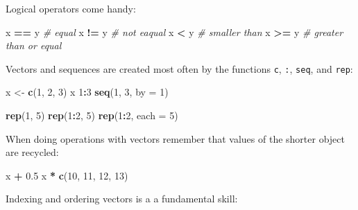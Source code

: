 \documentclass[12pt,]{book}
\newenvironment{Shaded}{\begin{snugshade}}{\end{snugshade}}
\newcommand{\CommentTok}[1]{\textcolor[rgb]{0.56,0.35,0.01}{\textit{#1}}}
\newcommand{\DataTypeTok}[1]{\textcolor[rgb]{0.13,0.29,0.53}{#1}}
\newcommand{\DecValTok}[1]{\textcolor[rgb]{0.00,0.00,0.81}{#1}}
\newcommand{\FloatTok}[1]{\textcolor[rgb]{0.00,0.00,0.81}{#1}}
\newcommand{\KeywordTok}[1]{\textcolor[rgb]{0.13,0.29,0.53}{\textbf{#1}}}
\newcommand{\NormalTok}[1]{#1}
\newcommand{\OperatorTok}[1]{\textcolor[rgb]{0.81,0.36,0.00}{\textbf{#1}}}
\newcommand{\StringTok}[1]{\textcolor[rgb]{0.31,0.60,0.02}{#1}}
\begin{document}
Logical operators come handy:

\begin{Shaded}
\begin{Highlighting}[]
\NormalTok{x }\OperatorTok{==}\StringTok{ }\NormalTok{y }\CommentTok{# equal}
\NormalTok{x }\OperatorTok{!=}\StringTok{ }\NormalTok{y }\CommentTok{# not eaqual}
\NormalTok{x }\OperatorTok{<}\StringTok{ }\NormalTok{y }\CommentTok{# smaller than}
\NormalTok{x }\OperatorTok{>=}\StringTok{ }\NormalTok{y }\CommentTok{# greater than or equal}
\end{Highlighting}
\end{Shaded}

Vectors and sequences are created most often by the functions
\texttt{c}, \texttt{:}, \texttt{seq}, and \texttt{rep}:

\begin{Shaded}
\begin{Highlighting}[]
\NormalTok{x <-}\StringTok{ }\KeywordTok{c}\NormalTok{(}\DecValTok{1}\NormalTok{, }\DecValTok{2}\NormalTok{, }\DecValTok{3}\NormalTok{)}
\NormalTok{x}
\DecValTok{1}\OperatorTok{:}\DecValTok{3}
\KeywordTok{seq}\NormalTok{(}\DecValTok{1}\NormalTok{, }\DecValTok{3}\NormalTok{, }\DataTypeTok{by =} \DecValTok{1}\NormalTok{)}

\KeywordTok{rep}\NormalTok{(}\DecValTok{1}\NormalTok{, }\DecValTok{5}\NormalTok{)}
\KeywordTok{rep}\NormalTok{(}\DecValTok{1}\OperatorTok{:}\DecValTok{2}\NormalTok{, }\DecValTok{5}\NormalTok{)}
\KeywordTok{rep}\NormalTok{(}\DecValTok{1}\OperatorTok{:}\DecValTok{2}\NormalTok{, }\DataTypeTok{each =} \DecValTok{5}\NormalTok{)}
\end{Highlighting}
\end{Shaded}

When doing operations with vectors remember that values of
the shorter object are recycled:

\begin{Shaded}
\begin{Highlighting}[]
\NormalTok{x }\OperatorTok{+}\StringTok{ }\FloatTok{0.5}
\NormalTok{x }\OperatorTok{*}\StringTok{ }\KeywordTok{c}\NormalTok{(}\DecValTok{10}\NormalTok{, }\DecValTok{11}\NormalTok{, }\DecValTok{12}\NormalTok{, }\DecValTok{13}\NormalTok{)}
\end{Highlighting}
\end{Shaded}

Indexing and ordering vectors is a a fundamental skill:
\end{document}
